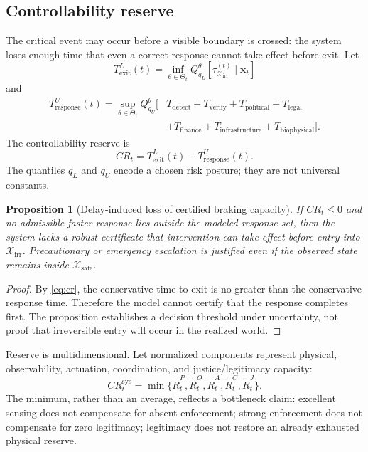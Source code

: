 \documentclass[11pt,a4paper]{article}
\numberwithin{equation}{section}
\theoremstyle{definition}
\theoremstyle{plain}
\newtheorem{proposition}[definition]{Proposition}
\theoremstyle{remark}
\newcommand{\safe}{\mathcal{X}_{\mathrm{safe}}}
\newcommand{\irrev}{\mathcal{X}_{\mathrm{irr}}}
\newcommand{\state}{\bm{x}}
\begin{document}
\subsection{Controllability reserve}

The critical event may occur before a visible boundary is crossed: the system loses enough time that even a correct response cannot take effect before exit. Let
\begin{equation}
T_{\mathrm{exit}}^{L}(t)=
\inf_{\theta\in\Theta_t}
Q_{q_L}^{\theta}\!\left[\tau_{\irrev}^{(t)}\mid\state_t\right]
\label{eq:texit}
\end{equation}
and
\begin{align}
T_{\mathrm{response}}^{U}(t)=
\sup_{\theta\in\Theta_t}Q_{q_U}^{\theta}\big[&
T_{\mathrm{detect}}+T_{\mathrm{verify}}+T_{\mathrm{political}}
+T_{\mathrm{legal}} \nonumber\\
&+T_{\mathrm{finance}}+T_{\mathrm{infrastructure}}
+T_{\mathrm{biophysical}}
\big].
\label{eq:tresponse}
\end{align}
The controllability reserve is
\begin{equation}
\boxed{
CR_t=T_{\mathrm{exit}}^{L}(t)-T_{\mathrm{response}}^{U}(t).
}
\label{eq:cr}
\end{equation}
The quantiles $q_L$ and $q_U$ encode a chosen risk posture; they are not universal constants.

\begin{proposition}[Delay-induced loss of certified braking capacity]
If $CR_t\le0$ and no admissible faster response lies outside the modeled response set, then the system lacks a robust certificate that intervention can take effect before entry into $\irrev$. Precautionary or emergency escalation is justified even if the observed state remains inside $\safe$.
\end{proposition}

\begin{proof}
By \cref{eq:cr}, the conservative time to exit is no greater than the conservative response time. Therefore the model cannot certify that the response completes first. The proposition establishes a decision threshold under uncertainty, not proof that irreversible entry will occur in the realized world.
\end{proof}

Reserve is multidimensional. Let normalized components represent physical, observability, actuation, coordination, and justice/legitimacy capacity:
\begin{equation}
CR_t^{\mathrm{sys}}=
\min\{\widetilde R_t^P,\widetilde R_t^O,
\widetilde R_t^A,\widetilde R_t^C,\widetilde R_t^J\}.
\label{eq:systemreserve}
\end{equation}
The minimum, rather than an average, reflects a bottleneck claim: excellent sensing does not compensate for absent enforcement; strong enforcement does not compensate for zero legitimacy; legitimacy does not restore an already exhausted physical reserve.
\end{document}
